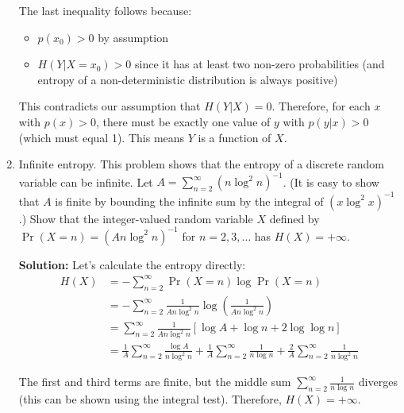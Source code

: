 \documentclass{article}
\begin{document}
\begin{enumerate}
    The last inequality follows because:
    \begin{itemize}
        \item $p(x_0) > 0$ by assumption
        \item $H(Y|X=x_0) > 0$ since it has at least two non-zero probabilities (and entropy of a non-deterministic distribution is always positive)
    \end{itemize}
    
    This contradicts our assumption that $H(Y|X) = 0$. Therefore, for each $x$ with $p(x) > 0$, there must be exactly one value of $y$ with $p(y|x) > 0$ (which must equal 1). This means $Y$ is a function of $X$.

    \item Infinite entropy. This problem shows that the entropy of a discrete random variable can be infinite. Let $A = \sum_{n=2}^{\infty} (n \log^2 n)^{-1}$. (It is easy to show that $A$ is finite by bounding the infinite sum by the integral of $(x \log^2 x)^{-1}$.) Show that the integer-valued random variable $X$ defined by $\Pr(X=n) = (An \log^2 n)^{-1}$ for $n = 2,3,\ldots$ has $H(X) = +\infty$.

    \textbf{Solution:} Let's calculate the entropy directly:
    \begin{align*}
        H(X) &= -\sum_{n=2}^{\infty} \Pr(X=n) \log \Pr(X=n) \\
        &= -\sum_{n=2}^{\infty} \frac{1}{An \log^2 n} \log\left(\frac{1}{An \log^2 n}\right) \\
        &= \sum_{n=2}^{\infty} \frac{1}{An \log^2 n} \left[\log A + \log n + 2\log\log n\right] \\
        &= \frac{1}{A}\sum_{n=2}^{\infty} \frac{\log A}{n \log^2 n} + \frac{1}{A}\sum_{n=2}^{\infty} \frac{1}{n \log n} + \frac{2}{A}\sum_{n=2}^{\infty} \frac{1}{n \log^2 n}
    \end{align*}
    
    The first and third terms are finite, but the middle sum $\sum_{n=2}^{\infty} \frac{1}{n \log n}$ diverges (this can be shown using the integral test). Therefore, $H(X) = +\infty$.

\end{enumerate}


\end{document}
